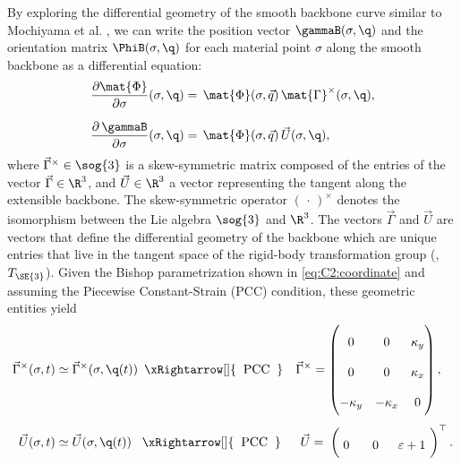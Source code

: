 By exploring the differential geometry of the smooth backbone curve similar to Mochiyama et al. \cite{Mochiyama2003}, we can write the position vector $\gammaB(\sigma,\q)$ and the orientation matrix $\PhiB(\sigma,\q)$ for each material point $\sigma$ along the smooth backbone as a differential equation:
%
\begin{align}
\renewcommand*{\arraystretch}{2}{}
\frac{\partial \,\!\mat{\Phi}}{\partial \sigma}(\sigma,\q) & = \, \mat{\Phi}(\sigma,\vec{q}) \,\mat{\Gamma}^{\times} (\sigma,\q), \label{eq:C2:change_phi} \\[0.75em]
%
\frac{\partial \, \gammaB}{\partial \sigma}(\sigma,\q) & = \, \mat{\Phi}(\sigma,\vec{q}) \, \vec{U}(\sigma,\q), \label{eq:C2:change_p}
\end{align}
%
where \editl $\vec{\Gamma}^\times \in \sog{3}$ \editr is a skew-symmetric matrix composed of the entries of the vector $\vec{\Gamma} \in \R^3$, and $\vec{U}\in \R^3$ a vector representing the tangent along the extensible backbone. The skew-symmetric operator $(\,\cdot\,)^\times$ denotes the isomorphism between the Lie algebra $\sog{3}$ and $\R^3$. The vectors $\vec{\Gamma}$ and $\vec{U}$ are vectors that define the differential geometry of the backbone
\cite{Mochiyama2003} which are unique entries that live in the tangent space of the rigid-body transformation group (\ie, $T_{\SE{3}}$). Given the Bishop parametrization shown in \eqref{eq:C2:coordinate} and assuming the Piecewise Constant-Strain (PCC) condition, these geometric entities yield
%
\begin{align}
\vec{\Gamma}^\times(\sigma,t) & \simeq \vec{\Gamma}^\times(\sigma,\q(t)) \!\!\!\quad \xRightarrow[]{\textrm{\;\;PCC\;\;}}\quad \vec{\Gamma}^\times = \begin{pmatrix} 0 & 0 & \kappa_y \\ 0 & 0 & \kappa_x \\ -\kappa_y & -\kappa_x & 0 \end{pmatrix}, \label{eq:C2:Gamma}\\[0.35em]
%
\vec{U}(\sigma,t) & \simeq \vec{U}(\sigma,\q(t)) \!\quad \xRightarrow[]{\textrm{\;\;PCC\;\;}} \quad \;\; \vec{U} = \;\begin{pmatrix} \;0\;\;  &  \;0\;\; & \varepsilon + 1\ \end{pmatrix}^\top. \label{eq:C2:U}
\end{align}
%
